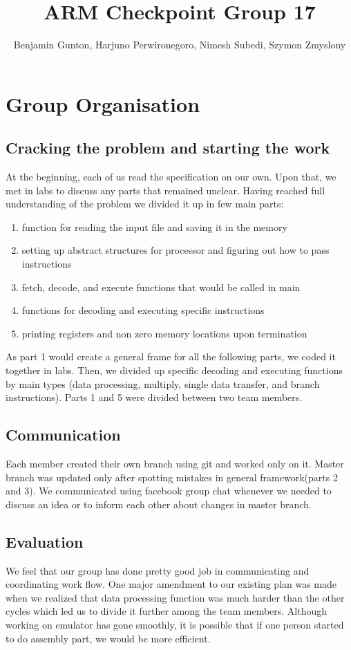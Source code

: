 \documentclass[11pt]{article}
\begin{document}
\title{ARM Checkpoint Group 17 }
\author{Benjamin Gunton, Harjuno Perwironegoro, Nimesh Subedi, Szymon Zmyslony}

\maketitle

\section{Group Organisation}
\subsection{Cracking the problem and starting the work}
At the beginning, each of us read the specification on our own. Upon that, we met
in labs to discuss any parts that remained unclear. Having reached full understanding 
of the problem we divided it up in few main parts:
\begin{enumerate}  
	\item function for reading the input file and saving it in the memory
	\item setting up abstract structures for processor and figuring out how to pass instructions
	\item fetch, decode, and execute functions that would be called in main
	\item functions for decoding and executing specific instructions
	\item printing registers and non zero memory locations upon termination
\end{enumerate}
As part 1 would create a general frame for all the following parts, we coded it together in labs. Then, we divided up specific decoding and executing functions by main types (data processing, multiply, single data transfer, and branch instructions). Parts 1 and 5 were divided between two team members.

	\subsection{Communication}
	Each member created their own branch using git and worked only on it. Master branch was updated only after spotting mistakes in general framework(parts 2 and 3). We communicated using facebook group chat whenever we needed to discuss an idea or to inform each other about changes in master branch. 
	\subsection{Evaluation}
	We feel that our group has done pretty good job in communicating and coordinating work flow. One major amendment to our existing plan was made when we realized that data processing function was much harder than the other cycles which led us to divide it further among the team members. Although working on emulator has gone smoothly, it is possible that if one person started to do assembly part, we would be more efficient. 
	
\end{document}
